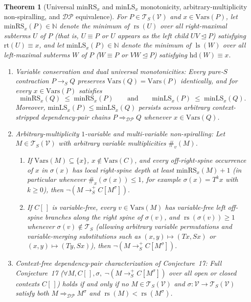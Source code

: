 \documentclass[11pt,reqno]{amsart}
\numberwithin{equation}{section}
\theoremstyle{plain}
\newtheorem{theorem}{Theorem}[section]
\theoremstyle{definition}
\theoremstyle{remark}
\DeclareMathOperator{\ls}{ls}
\DeclareMathOperator{\rs}{rs}
\newcommand{\TS}{\mathcal{T}_S}
\newcommand{\TSV}{\mathcal{T}_S(\mathcal{V})}
\newcommand{\redS}{\to_S}
\newcommand{\redSp}{\to_S^+}
\begin{document}
\begin{theorem}[Universal $\mathrm{minRS}_x$ and $\mathrm{minLS}_x$ monotonicity, arbitrary-multiplicity non-spiralling, and $\mathcal{DP}$ equivalence]\label{thm:conj17-minmaxrs-monotonicity}
For $P \in \TSV$ and $x \in \mathrm{Vars}(P)$, let $\mathrm{minRS}_x(P) \in \mathbb{N}$ denote the minimum of $\rs(U)$ over all right-maximal subterms $U$ of $P$ (that is, $U \equiv P$ or $U$ appears as the left child $U V \trianglelefteq P$) satisfying $\mathrm{rt}(U) \equiv x$, and let $\mathrm{minLS}_x(P) \in \mathbb{N}$ denote the minimum of $\ls(W)$ over all left-maximal subterms $W$ of $P$ ($W \equiv P$ or $V W \trianglelefteq P$) satisfying $\mathrm{hd}(W) \equiv x$.
\begin{enumerate}[label=(\roman*),leftmargin=2.2em]
  \item \emph{Variable conservation and dual universal monotonicities:} Every pure-$S$ contraction $P \redS Q$ preserves $\mathrm{Vars}(Q) = \mathrm{Vars}(P)$ identically, and for every $x \in \mathrm{Vars}(P)$ satisfies
  \begin{equation}\label{eq:minrs-minls-mono}
    \mathrm{minRS}_x(Q) \;\le\; \mathrm{minRS}_x(P) \qquad \text{and} \qquad \mathrm{minLS}_x(P) \;\le\; \mathrm{minLS}_x(Q).
  \end{equation}
  Moreover, $\mathrm{minLS}_x(P) \le \mathrm{minLS}_x(Q)$ persists across arbitrary context-stripped dependency-pair chains $P \Rightarrow_{\mathcal{DP}} Q$ whenever $x \in \mathrm{Vars}(Q)$.
  \item \emph{Arbitrary-multiplicity $1$-variable and multi-variable non-spiralling:} Let $M \in \TSV$ with arbitrary variable multiplicities $\#_v(M)$.
  \begin{enumerate}[label=(\alph*),leftmargin=1.8em]
    \item If $\mathrm{Vars}(M) \subseteq \{x\}$, $x \notin \mathrm{Vars}(C)$, and every off-right-spine occurrence of $x$ in $\sigma(x)$ has local right-spine depth at least $\mathrm{minRS}_x(M) + 1$ (in particular whenever $\#_x(\sigma(x)) \le 1$, for example $\sigma(x) = T^k x$ with $k \ge 0$), then $\neg(M \redSp C[M^\sigma])$.
    \item If $C[\,]$ is variable-free, every $v \in \mathrm{Vars}(M)$ has variable-free left off-spine branches along the right spine of $\sigma(v)$, and $\rs(\sigma(v)) \ge 1$ whenever $\sigma(v) \notin \TS$ (allowing arbitrary variable permutations and variable-merging substitutions such as $(x, y) \mapsto (T x, S x)$ or $(x, y) \mapsto (T y, S x)$), then $\neg(M \redSp C[M^\sigma])$.
  \end{enumerate}
  \item \emph{Context-free dependency-pair characterization of Conjecture~17:} Full Conjecture~17 ($\forall M, C[\,], \sigma,\; \neg(M \redSp C[M^\sigma])$ over all open or closed contexts $C[\,]$) holds if and only if no $M \in \TSV$ and $\sigma \colon \mathcal{V} \to \TSV$ satisfy both $M \Rightarrow_{\mathcal{DP}} M^\sigma$ and $\rs(M) < \rs(M^\sigma)$.
\end{enumerate}
\end{theorem}
\end{document}
